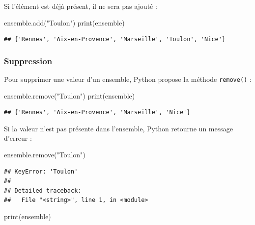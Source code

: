 \documentclass[12pt,]{book}
\newenvironment{Shaded}{\begin{snugshade}}{\end{snugshade}}
\newcommand{\StringTok}[1]{\textcolor[rgb]{0.31,0.60,0.02}{#1}}
\newcommand{\BuiltInTok}[1]{#1}
\newcommand{\NormalTok}[1]{#1}
\numberwithin{equation}{section}
\numberwithin{countremarque}{section}
\begin{document}
Si l'élément est déjà présent, il ne sera pas ajouté :

\begin{Shaded}
\begin{Highlighting}[]
\NormalTok{ensemble.add(}\StringTok{"Toulon"}\NormalTok{)}
\BuiltInTok{print}\NormalTok{(ensemble)}
\end{Highlighting}
\end{Shaded}

\begin{lstlisting}
## {'Rennes', 'Aix-en-Provence', 'Marseille', 'Toulon', 'Nice'}
\end{lstlisting}

\subsubsection{Suppression}\label{suppression}

Pour supprimer une valeur d'un ensemble, Python propose la méthode
\texttt{remove()} :

\begin{Shaded}
\begin{Highlighting}[]
\NormalTok{ensemble.remove(}\StringTok{"Toulon"}\NormalTok{)}
\BuiltInTok{print}\NormalTok{(ensemble)}
\end{Highlighting}
\end{Shaded}

\begin{lstlisting}
## {'Rennes', 'Aix-en-Provence', 'Marseille', 'Nice'}
\end{lstlisting}

Si la valeur n'est pas présente dans l'ensemble, Python retourne un
message d'erreur :

\begin{Shaded}
\begin{Highlighting}[]
\NormalTok{ensemble.remove(}\StringTok{"Toulon"}\NormalTok{)}
\end{Highlighting}
\end{Shaded}

\begin{lstlisting}
## KeyError: 'Toulon'
## 
## Detailed traceback: 
##   File "<string>", line 1, in <module>
\end{lstlisting}

\begin{Shaded}
\begin{Highlighting}[]
\BuiltInTok{print}\NormalTok{(ensemble)}
\end{Highlighting}
\end{Shaded}
\end{document}

